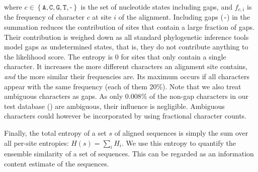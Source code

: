 where $c \in \left\{ \texttt{A}, \texttt{C}, \texttt{G}, \texttt{T}, \texttt{-} \right\}$ is the set of nucleotide states
including gaps, and $ f_{c,i} $ is the frequency of character $c$ at site $i$ of the alignment.
Including gaps (\texttt{-}) in the summation reduces the contribution of sites that contain a large fraction of gaps.
Their contribution is weighed down as all standard phylogenetic inference tools model gaps as undetermined states,
that is, they do not contribute anything to the likelihood score.
The entropy is \num{0} for sites that only contain a single character.
It increases the more different characters an alignment site contains, {\em and} the more similar their frequencies are.
Its maximum occurs if all characters appear with the same frequency (each of them \num{20}\%).
Note that we also treat ambiguous characters as gaps.
As only \num{0.008}\% of the non-gap characters in our test database () are ambiguous,
their influence is negligible.
Ambiguous characters could however be incorporated by using fractional character counts.

Finally, the total entropy of a set $s$ of aligned sequences is simply the sum over all per-site entropies:
$H(s) = \sum_i H_i$.
We use this entropy to quantify the ensemble similarity of a set of sequences.
This can be regarded as an information content estimate of the sequences.



